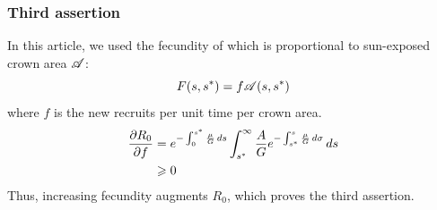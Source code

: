 \begin{refsection}
\subsubsection{Third assertion}
In this article, we used the fecundity of \citet{Purves2008} which is proportional to sun-exposed crown area $ \mathscr{A} $:
\[
	F(s, {s}^{*}) = f \mathscr{A}(s, {s}^{*})
\]
where $ f $ is the new recruits per unit time per crown area.
\begin{align*}
	\frac{\partial R_0}{\partial f} &= e^{-\int_0^{{s}^{*}} \frac{\mu}{G} \, ds} \int_{{s}^{*}}^{\infty} \frac{A}{G} e^{-\int_{{s}^{*}}^{s} \frac{\mu}{G} \, d \sigma} \, ds \\
		&\geqslant 0
\end{align*}
Thus, increasing fecundity augments $ R_0 $, which proves the third assertion.

\printbibliography[heading=subbibliography]
\end{refsection}
